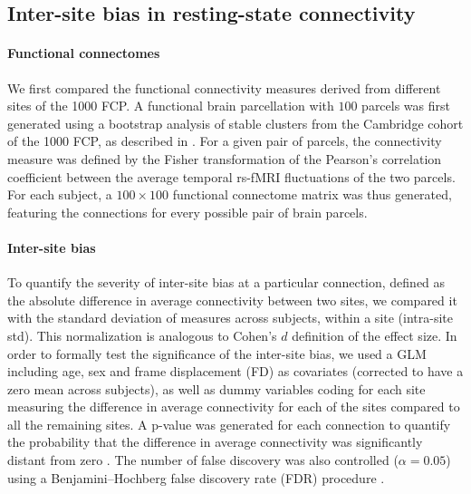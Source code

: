 \documentclass[authoryear]{elsarticle}
\begin{document}
\subsection{Inter-site bias in resting-state connectivity}
\paragraph{Functional connectomes} We first compared the functional connectivity measures derived from different sites of the 1000 FCP. A functional brain parcellation with $100$ parcels was first generated using a bootstrap analysis of stable clusters \citep{Bellec2010c} from the Cambridge cohort of the 1000 FCP, as described in \cite{Orban2015}. For a given pair of parcels, the connectivity measure was defined by the Fisher transformation of the Pearson's correlation coefficient between the average temporal rs-fMRI fluctuations of the two parcels. For each subject, a $100 \times 100$ functional connectome matrix was thus generated, featuring the connections for every possible pair of brain parcels. 

\paragraph{Inter-site bias} To quantify the severity of inter-site bias at a particular connection, defined as the absolute difference in average connectivity between two sites, we compared it with the standard deviation of measures across subjects, within a site (intra-site std). This normalization is analogous to Cohen's $d$ definition of the effect size. In order to formally test the significance of the inter-site bias, we used a GLM including age, sex and frame displacement (FD) as covariates (corrected to have a zero mean across subjects), as well as dummy variables coding for each site measuring the difference in average connectivity for each of the sites compared to all the remaining sites. A p-value was generated for each connection to quantify the probability that the difference in average connectivity was significantly distant from zero \citep{Worsley1995}. The number of false discovery was also controlled ($\alpha=0.05$) using a Benjamini–Hochberg false discovery rate (FDR) procedure \citep{Benjamini1995}.

\end{document}
